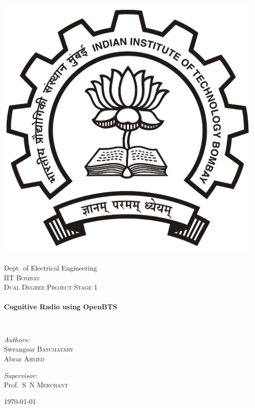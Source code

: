 \begin{titlepage}
\begin{center}

\includegraphics[width=0.23\textheight]{iitbLogo}~\\[1cm]
Dept. of Electrical Engineering\\[0.3cm]
\textsc{\LARGE IIT Bombay}\\[1.5cm]

\textsc{\Large Dual Degree Project Stage 1}\\[0.5cm]

\HRule \\[0.4cm]
{ \huge \bfseries Cognitive Radio using OpenBTS\\[0.4cm] }

\HRule \\[1.5cm]

\begin{minipage}{0.4\textwidth}
\begin{flushleft} \large
\emph{Authors:}\\
Swrangsar \textsc{Basumatary}\\
Abrar \textsc{Ahmed}
\end{flushleft}
\end{minipage}
\begin{minipage}{0.4\textwidth}
\begin{flushright} \large
\emph{Supervisor:} \\
Prof.~S~N \textsc{Merchant}
\end{flushright}
\end{minipage}

\vfill

{\large \today}

\end{center}
\end{titlepage}
